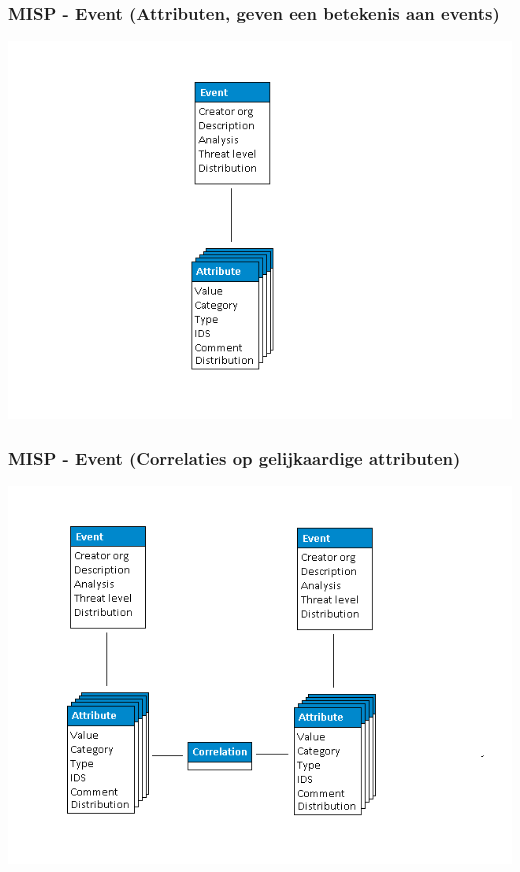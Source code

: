 \begin{frame}
    \frametitle{MISP - Event \newline (Attributen, geven een betekenis aan events)}
    \includegraphics[scale=0.45]{screenshots/datamodel2.png}
\end{frame}

\begin{frame}
    \frametitle{MISP - Event \newline (Correlaties op gelijkaardige attributen)}
    \includegraphics[scale=0.45]{screenshots/datamodel3.png}
\end{frame}

